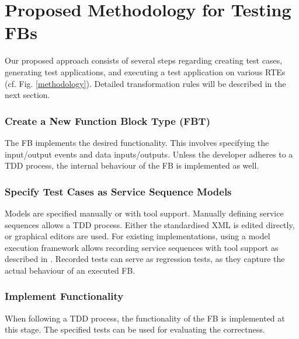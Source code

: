 \documentclass[conference]{IEEEtran}
\begin{document}
\section{Proposed Methodology for Testing FBs}
Our proposed approach consists of several steps regarding creating test cases, generating test applications, and executing a test application on various RTEs (cf. Fig. \ref{methodology}). Detailed transformation rules will be described in the next section.

\subsubsection{Create a New Function Block Type (FBT)} The FB implements the desired functionality. This involves specifying the input/output events and data inputs/outputs. Unless the developer adheres to a TDD process, the internal behaviour of the FB is implemented as well.

\subsubsection{Specify Test Cases as Service Sequence Models} Models are specified manually or with tool support. Manually defining service sequences allows a TDD process. Either the standardised XML is edited directly, or graphical editors are used. For existing implementations, using a model execution framework allows recording service sequences with tool support as described in \cite{wiesmayr2021}. Recorded tests can serve as regression tests, as they capture the actual behaviour of an executed FB.


    \subsubsection{Implement Functionality}
    When following a TDD process, the functionality of the FB is implemented at this stage. The specified tests can be used for evaluating the correctness.
   
\end{document}
